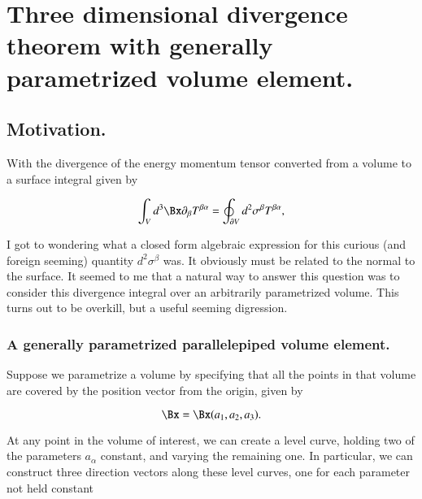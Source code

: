 %
%

\chapter{Three dimensional divergence theorem with generally parametrized volume element.}
\label{chap:divergence3Dtensor}
{}
\date{April 10, 2011}

\beginArtWithToc

\section{Motivation.}

With the divergence of the energy momentum tensor converted from a volume to a surface integral given by

\begin{equation}\label{eqn:relativisticElectrodynamicsPS6:340}
\int_V d^3 \Bx \partial_\beta T^{\beta \alpha} = \oint_{\partial V} d^2 \sigma^\beta T^{\beta \alpha},
\end{equation}

I got to wondering what a closed form algebraic expression for this curious (and foreign seeming) quantity $d^2 \sigma^\beta$ was.  It obviously must be related to the normal to the surface.  It seemed to me that a natural way to answer this question was to consider this divergence integral over an arbitrarily parametrized volume.  This turns out to be overkill, but a useful seeming digression.

\subsection{A generally parametrized parallelepiped volume element.}

Suppose we parametrize a volume by specifying that all the points in that volume are covered by the position vector from the origin, given by

\begin{equation}\label{eqn:relativisticElectrodynamicsPS6:360}
\Bx = \Bx(a_1, a_2, a_3).
\end{equation}

At any point in the volume of interest, we can create a level curve, holding two of the parameters $a_\alpha$ constant, and varying the remaining one.  In particular, we can construct three direction vectors along these level curves, one for each parameter not held constant

